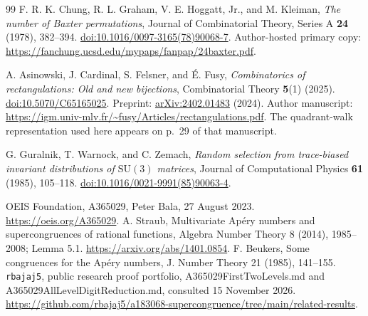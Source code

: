 \documentclass[11pt,a4paper]{article}
\theoremstyle{remark}\newtheorem{remark}[theorem]{Remark}
\numberwithin{equation}{section}
\begin{document}
\begin{thebibliography}{99}
F. R. K. Chung, R. L. Graham, V. E. Hoggatt, Jr., and M. Kleiman,
\emph{The number of Baxter permutations},
Journal of Combinatorial Theory, Series A \textbf{24} (1978), 382--394.
\href{https://doi.org/10.1016/0097-3165(78)90068-7}{doi:10.1016/0097-3165(78)90068-7}.
Author-hosted primary copy: \url{https://fanchung.ucsd.edu/mypaps/fanpap/24baxter.pdf}.

A. Asinowski, J. Cardinal, S. Felsner, and \'{E}. Fusy,
\emph{Combinatorics of rectangulations: Old and new bijections},
Combinatorial Theory \textbf{5}(1) (2025).
\href{https://doi.org/10.5070/C65165025}{doi:10.5070/C65165025}.
Preprint: \href{https://arxiv.org/abs/2402.01483}{arXiv:2402.01483} (2024).
Author manuscript: \url{https://igm.univ-mlv.fr/~fusy/Articles/rectangulations.pdf}.
The quadrant-walk representation used here appears on p.~29 of that manuscript.

G. Guralnik, T. Warnock, and C. Zemach,
\emph{Random selection from trace-biased invariant distributions of
$\mathrm{SU}(3)$ matrices},
Journal of Computational Physics \textbf{61} (1985), 105--118.
\href{https://doi.org/10.1016/0021-9991(85)90063-4}{doi:10.1016/0021-9991(85)90063-4}.

 OEIS Foundation, A365029, Peter Bala, 27 August 2023.
\url{https://oeis.org/A365029}.
 A. Straub, Multivariate Ap\'ery numbers and
supercongruences of rational functions, Algebra Number Theory 8 (2014),
1985--2008; Lemma 5.1. \url{https://arxiv.org/abs/1401.0854}.
 F. Beukers, Some congruences for the Ap\'ery numbers,
J. Number Theory 21 (1985), 141--155.
 \texttt{rbajaj5}, public research proof portfolio,
A365029FirstTwoLevels.md and A365029AllLevelDigitReduction.md,
consulted 15 November 2026.
\url{https://github.com/rbajaj5/a183068-supercongruence/tree/main/related-results}.


\end{thebibliography}
\end{document}
